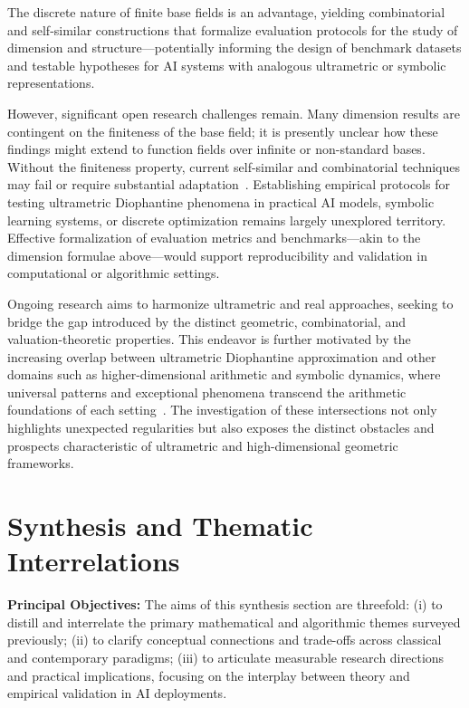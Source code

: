 \documentclass[sigconf]{acmart}
\begin{document}
The discrete nature of finite base fields is an advantage, yielding combinatorial and self-similar constructions that formalize evaluation protocols for the study of dimension and structure—potentially informing the design of benchmark datasets and testable hypotheses for AI systems with analogous ultrametric or symbolic representations.

However, significant open research challenges remain. Many dimension results are contingent on the finiteness of the base field; it is presently unclear how these findings might extend to function fields over infinite or non-standard bases. Without the finiteness property, current self-similar and combinatorial techniques may fail or require substantial adaptation~\cite{ref79}. Establishing empirical protocols for testing ultrametric Diophantine phenomena in practical AI models, symbolic learning systems, or discrete optimization remains largely unexplored territory. Effective formalization of evaluation metrics and benchmarks—akin to the dimension formulae above—would support reproducibility and validation in computational or algorithmic settings.

Ongoing research aims to harmonize ultrametric and real approaches, seeking to bridge the gap introduced by the distinct geometric, combinatorial, and valuation-theoretic properties. This endeavor is further motivated by the increasing overlap between ultrametric Diophantine approximation and other domains such as higher-dimensional arithmetic and symbolic dynamics, where universal patterns and exceptional phenomena transcend the arithmetic foundations of each setting~\cite{ref79,ref109}. The investigation of these intersections not only highlights unexpected regularities but also exposes the distinct obstacles and prospects characteristic of ultrametric and high-dimensional geometric frameworks.

\section{Synthesis and Thematic Interrelations}

\textbf{Principal Objectives:}
The aims of this synthesis section are threefold: (i) to distill and interrelate the primary mathematical and algorithmic themes surveyed previously; (ii) to clarify conceptual connections and trade-offs across classical and contemporary paradigms; (iii) to articulate measurable research directions and practical implications, focusing on the interplay between theory and empirical validation in AI deployments.
\end{document}
